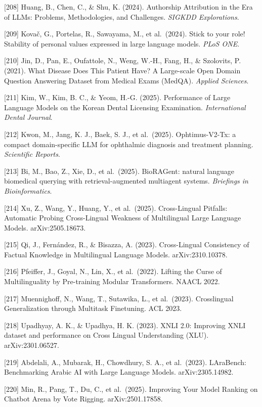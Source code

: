 {[}208{]} Huang, B., Chen, C., \& Shu, K. (2024). Authorship Attribution in the Era of LLMs: Problems, Methodologies, and Challenges. \emph{SIGKDD Explorations}.

{[}209{]} Kovač, G., Portelas, R., Sawayama, M., et al.~(2024). Stick to your role! Stability of personal values expressed in large language models. \emph{PLoS ONE}.

{[}210{]} Jin, D., Pan, E., Oufattole, N., Weng, W.-H., Fang, H., \& Szolovits, P. (2021). What Disease Does This Patient Have? A Large-scale Open Domain Question Answering Dataset from Medical Exams (MedQA). \emph{Applied Sciences}.

{[}211{]} Kim, W., Kim, B. C., \& Yeom, H.-G. (2025). Performance of Large Language Models on the Korean Dental Licensing Examination. \emph{International Dental Journal}.

{[}212{]} Kwon, M., Jang, K. J., Baek, S. J., et al.~(2025). Ophtimus-V2-Tx: a compact domain-specific LLM for ophthalmic diagnosis and treatment planning. \emph{Scientific Reports}.

{[}213{]} Bi, M., Bao, Z., Xie, D., et al.~(2025). BioRAGent: natural language biomedical querying with retrieval-augmented multiagent systems. \emph{Briefings in Bioinformatics}.

{[}214{]} Xu, Z., Wang, Y., Huang, Y., et al.~(2025). Cross-Lingual Pitfalls: Automatic Probing Cross-Lingual Weakness of Multilingual Large Language Models. arXiv:2505.18673.

{[}215{]} Qi, J., Fernández, R., \& Bisazza, A. (2023). Cross-Lingual Consistency of Factual Knowledge in Multilingual Language Models. arXiv:2310.10378.

{[}216{]} Pfeiffer, J., Goyal, N., Lin, X., et al.~(2022). Lifting the Curse of Multilinguality by Pre-training Modular Transformers. NAACL 2022.

{[}217{]} Muennighoff, N., Wang, T., Sutawika, L., et al.~(2023). Crosslingual Generalization through Multitask Finetuning. ACL 2023.

{[}218{]} Upadhyay, A. K., \& Upadhya, H. K. (2023). XNLI 2.0: Improving XNLI dataset and performance on Cross Lingual Understanding (XLU). arXiv:2301.06527.

{[}219{]} Abdelali, A., Mubarak, H., Chowdhury, S. A., et al.~(2023). LAraBench: Benchmarking Arabic AI with Large Language Models. arXiv:2305.14982.

{[}220{]} Min, R., Pang, T., Du, C., et al.~(2025). Improving Your Model Ranking on Chatbot Arena by Vote Rigging. arXiv:2501.17858.

